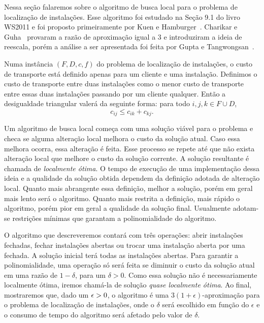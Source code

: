 Nessa seção falaremos sobre o algoritmo de busca local para o problema de localização de instalações. Esse algoritmo foi estudado na Seção 9.1 do livro WS2011 e foi proposto primeiramente por Kuen e Hamburger~\cite{KH}. Charikar e Guha~\cite{Charikar&Guha'05} provaram a razão de aproximação igual a 3 e introduziram a ideia de reescala, porém a análise a ser apresentada foi feita por Gupta e Tangwongsan~\cite{DBLP:journals/corr/abs-0809-2554}.

Numa instância $(F,D,c,f)$ do problema de localização de instalações, o custo de transporte está definido apenas para um cliente e uma instalação.
Definimos o custo de transporte entre duas instalações como o menor custo de transporte entre essas duas instalações passando por um cliente qualquer. Então a desigualdade triangular valerá da seguinte forma: para todo $i,j,k \in F \cup D$, 
\[ c_{ij} \leq c_{ik} + c_{kj}.\]

Um algoritmo de busca local começa com uma solução viável para o problema e checa se alguma alteração local melhora o custo da solução atual. Caso essa melhora ocorra, essa alteração é feita. Esse processo se repete até que não exista alteração local que melhore o custo da solução corrente. A solução resultante é chamada de \emph{localmente ótima}. O tempo de execução de uma implementação dessa ideia e a qualidade da solução obtida dependem da definição adotada de alteração local. Quanto mais abrangente essa definição, melhor a solução, porém em geral mais lento será o algoritmo. Quanto mais restrita a definição, mais rápido o algoritmo, porém pior em geral a qualidade da solução final. Usualmente adotam-se restrições mínimas que garantam a polinomialidade do algoritmo.

O algoritmo que descreveremos contará com três operações: abrir instalações fechadas, fechar instalações abertas ou trocar uma instalação aberta por uma fechada. A solução inicial terá todas as instalações abertas. Para garantir a polinomialidade, uma operação só será feita se diminuir o custo da solução atual em uma razão de $1-\delta$, para um $\delta>0$. Como essa solução não é necessariamente localmente ótima, iremos chamá-la de solução \emph{quase localmente ótima}. Ao final, mostraremos que, dado um $\epsilon > 0$, o algoritmo é uma $3(1 + \epsilon)$-aproximação para o problema de localização de instalações, onde o $\delta$ será escolhido em função do $\epsilon$ e o consumo de tempo do algoritmo será afetado pelo valor de $\delta$.

